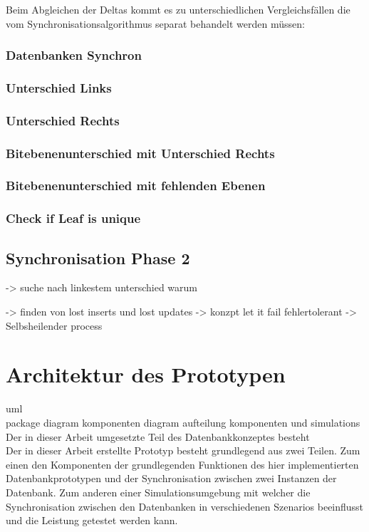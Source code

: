 \documentclass[a4paper,11pt,oneside,%
headsepline,												%
footsepline,												%
bibtotocnumbered									%
]{scrreprt}
\begin{document}
Beim Abgleichen der Deltas kommt es zu unterschiedlichen Vergleichsfällen die vom Synchronisationsalgorithmus separat behandelt werden müssen:
\subsubsection{Datenbanken Synchron}

\subsubsection{Unterschied Links}

\subsubsection{Unterschied Rechts}

\subsubsection{Bitebenenunterschied mit Unterschied Rechts}

\subsubsection{Bitebenenunterschied mit fehlenden Ebenen}


\subsubsection{Check if Leaf is unique}

\subsection{Synchronisation Phase 2}


-> suche nach linkestem unterschied warum 

-> finden von lost inserts und lost updates		
-> konzpt let it fail fehlertolerant 
-> Selbsheilender process
	
\section{Architektur des Prototypen}
uml\\ package diagram komponenten diagram
aufteilung komponenten und simulations\\

Der in dieser Arbeit umgesetzte Teil des Datenbankkonzeptes besteht\\
Der in dieser Arbeit erstellte Prototyp besteht grundlegend aus zwei Teilen. Zum einen den Komponenten der grundlegenden Funktionen des hier implementierten Datenbankprototypen und der Synchronisation zwischen zwei Instanzen der Datenbank. Zum anderen einer Simulationsumgebung mit welcher die Synchronisation zwischen den Datenbanken in verschiedenen Szenarios beeinflusst und die Leistung getestet werden kann. \\
\end{document}
